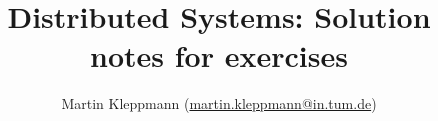 \documentclass{article}
\begin{document}
\title{Distributed Systems: Solution notes for exercises}
\author{Martin Kleppmann (\url{martin.kleppmann@in.tum.de})}
\date{}
\maketitle


\end{document}
